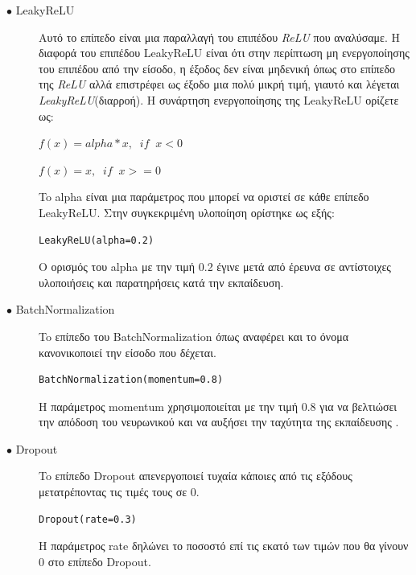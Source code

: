 \begin{description}
\item[$\bullet$ LeakyReLU] Αυτό το επίπεδο είναι μια παραλλαγή του επιπέδου \textit{ReLU} που αναλύσαμε. Η διαφορά  του επιπέδου LeakyReLU είναι ότι στην περίπτωση μη ενεργοποίησης του επιπέδου από την είσοδο, η έξοδος δεν είναι μηδενική όπως στο επίπεδο της \textit{ReLU} αλλά επιστρέφει ως έξοδο μια πολύ μικρή τιμή, γιαυτό και λέγεται \textit{LeakyReLU}(διαρροή). Η συνάρτηση ενεργοποίησης της LeakyReLU ορίζετε ως:
\par
$f(x) = alpha * x,  \;\; if \;\; x < 0$
\par
$f(x) = x,  \;\; if \;\; x >= 0$
\par
To alpha είναι μια παράμετρος που μπορεί να οριστεί σε κάθε επίπεδο LeakyReLU. Στην συγκεκριμένη υλοποίηση ορίστηκε ως εξής:
\begin{verbatim}
LeakyReLU(alpha=0.2)
\end{verbatim}
\par
O ορισμός του alpha με την τιμή 0.2 έγινε μετά από έρευνα σε αντίστοιχες υλοποιήσεις και παρατηρήσεις κατά την εκπαίδευση. \cite{firstgan} \cite{firstgan2} \cite{firstgan3} \cite{leakyrelu}
\end{description}

\begin{description}
\item[$\bullet$ BatchNormalization] To επίπεδο του BatchNormalization όπως αναφέρει και το όνομα κανονικοποιεί την είσοδο που δέχεται. \cite{batch}
\par
\begin{verbatim}
BatchNormalization(momentum=0.8)
\end{verbatim}
\par
Η παράμετρος momentum χρησιμοποιείται με την τιμή 0.8 για να βελτιώσει την απόδοση του νευρωνικού και να αυξήσει την ταχύτητα της εκπαίδευσης \cite{firstgan}.
\end{description}

\begin{description}
\item[$\bullet$ Dropout] To επίπεδο Dropout απενεργοποιεί τυχαία κάποιες από τις εξόδους μετατρέποντας τις τιμές τους σε 0. \cite{dropout}
\par
\begin{verbatim}
Dropout(rate=0.3)
\end{verbatim}
\par
H παράμετρος rate δηλώνει το ποσοστό επί τις εκατό των τιμών που θα γίνουν 0 στο επίπεδο Dropout.
\end{description}

